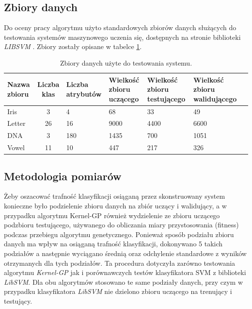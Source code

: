 \documentclass{article}
\begin{document}
	\subsection{Zbiory danych}
	Do oceny pracy algorytmu użyto standardowych zbiorów danych służących do testowania systemów maszynowego uczenia się, dostępnych na stronie biblioteki \emph{LIBSVM} \cite{chang_libsvm:_2011}. Zbiory zostały opisane w tabelce \ref{tab:datasets}.



\begin{table}[ht]
\begin{tabular}{||p{2cm}|c|p{1.5cm}|p{1.5cm}|p{1.5cm}|p{1.5cm}|p{1.5cm}||}
	\hline 
	Nazwa zbioru & Liczba klas & \hspace{0pt} Liczba atrybutów & \hspace{0pt} Wielkość zbioru uczącego & \hspace{0pt}Wielkość zbioru testującego & \hspace{0pt} Wielkość zbioru walidującego \\
	\hline 
	Iris & 3 & 4 & 68 & 33 & 49  \\ 
	\hline 
	Letter & 26 & 16 & 9000 & 4400 & 6600\\ 
	\hline 
	DNA & 3 & 180 & 1435 & 700 & 1051 \\ 
	\hline 
	Vowel & 11 & 10 & 447 & 217 & 326 \\ 
	\hline
	\end{tabular} 	
	\caption{Zbiory danych użyte do testowania systemu.\label{tab:datasets}} 	
\end{table}
	
	\subsection{Metodologia pomiarów}
	Żeby oszacować trafność klasyfikacji osiąganą przez skonstruowany system konieczne było podzielenie zbioru danych na zbiór uczący i walidujący, a w przypadku algorytmu Kernel-GP również wydzielenie ze zbioru uczącego podzbioru testującego, używanego do obliczania miary przystosowania (fitness) podczas przebiegu algorytmu genetycznego. Ponieważ sposób podziału zbioru danych ma wpływ na osiąganą trafność klasyfikacji, dokonywano 5 takich podziałów a następnie wyciągano średnią oraz odchylenie standardowe z wyników otrzymanych dla tych podziałów. Ta procedura dotyczyła zarówno testowania algorytmu \emph{Kernel-GP} jak i porównawczych testów klasyfikatora SVM z biblioteki \emph{LibSVM}. Dla obu algorytmów stosowano te same podziały danych, przy czym w przypadku klasyfikatora \emph{LibSVM} nie dzielono zbioru uczącego na trenujący i testujący.
	
\end{document}
